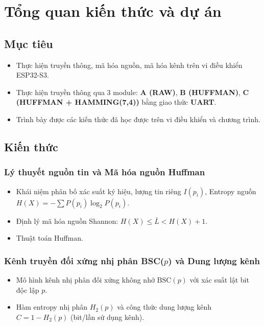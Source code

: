 \documentclass[12pt,a4paper]{report}
\begin{document}
\tableofcontents
\clearpage
{}

\chapter{Tổng quan kiến thức và dự án}

\section{Mục tiêu}
\begin{itemize}
    \item Thực hiện truyền thông, mã hóa nguồn, mã hóa kênh trên vi điều khiển ESP32-S3.
    \item Thực hiện truyền thông qua 3 module: \textbf{A (RAW)}, \textbf{B (HUFFMAN)}, \textbf{C (HUFFMAN + HAMMING(7,4))} bằng giao thức \textbf{UART}.
    \item Trình bày được các kiến thức đã học được trên vi điều khiển và chương trình.
\end{itemize}
\section{Kiến thức}
\subsection{Lý thuyết nguồn tin và Mã hóa nguồn Huffman}
\begin{itemize}[leftmargin=*,nosep]
    \item Khái niệm phân bố xác suất ký hiệu, lượng tin riêng $I(p_i)$, Entropy nguồn $H(X) = -\sum P(p_i)\log_2 P(p_i)$.
    \item Định lý mã hóa nguồn Shannon: $H(X) \le \bar{L} < H(X) + 1$.
    \item Thuật toán Huffman.
\end{itemize}

\subsection{Kênh truyền đối xứng nhị phân BSC($p$) và Dung lượng kênh}
\begin{itemize}[leftmargin=*,nosep]
    \item Mô hình kênh nhị phân đối xứng không nhớ $\text{BSC}(p)$ với xác suất lật bit độc lập $p$.
    \item Hàm entropy nhị phân $H_2(p)$ và công thức dung lượng kênh $C = 1 - H_2(p)$ (bit/lần sử dụng kênh).
\end{itemize}
\end{document}
